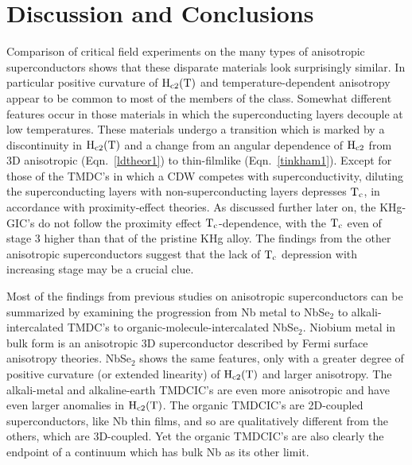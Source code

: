 \section{Discussion and Conclusions}
\label{otherdisc}

        Comparison  of critical field  experiments  on the  many   types of
anisotropic   superconductors  shows  that  these disparate  materials look
surprisingly similar.  In particular positive  curvature of $\rm H_{c2}(T)$
and temperature-dependent  anisotropy appear to  be  common  to most of the
members of the class.  Somewhat different features occur in those materials
in which the  superconducting layers decouple  at  low temperatures.  These
materials undergo a transition  which is marked by a  discontinuity in $\rm
H_{c2}(T)$ and a change from an angular dependence of  $\rm H_{c2}$ from 3D
anisotropic (Eqn.~\ref{ldtheor1})  to  thin-filmlike (Eqn.~\ref{tinkham1}).
Except  for    those of  the   TMDC's  in   which  a   CDW   competes  with
superconductivity,       diluting     the superconducting    layers    with
non-superconducting layers   depresses $\rm   T_c$,  in    accordance  with
proximity-effect theories.  As discussed further later on, the KHg-GIC's do
not  follow the proximity effect  $\rm T_c$-dependence,  with the $\rm T_c$
even of stage 3 higher than that  of the pristine KHg alloy.\cite{J140} The
findings from the  other anisotropic superconductors suggest  that the lack
of $\rm T_c$ depression with increasing stage may be a crucial clue.

        Most   of  the findings from    previous  studies  on   anisotropic
superconductors can   be  summarized  by examining  the progression from Nb
metal   to    NbSe$_2$      to      alkali-intercalated      TMDC's      to
organic-molecule-intercalated NbSe$_2$.   Niobium metal in bulk form  is an
anisotropic  3D   superconductor described  by  Fermi   surface  anisotropy
theories.\cite{butler80,kerchner81} NbSe$_2$ shows the same  features, only
with a greater degree of positive curvature (or extended linearity) of $\rm
H_{c2}(T)$  and   larger  anisotropy.\cite{dalrymple84,muto73,ikebe80}  The
alkali-metal and alkaline-earth TMDCIC's are even more anisotropic and have
even  larger  anomalies in   $\rm H_{c2}(T)$.\cite{somoano75,woollam76} The
organic TMDCIC's are 2D-coupled superconductors, like Nb thin films, and so
are qualitatively different from the others, which are 3D-coupled.  Yet the
organic TMDCIC's are also clearly the endpoint  of a continuum which has bulk Nb
as its other limit.

